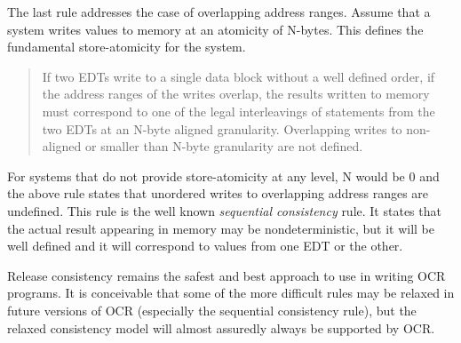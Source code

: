 The last rule addresses the case of overlapping address ranges.  Assume that
a system writes values to memory at an atomicity of N-bytes.  This defines
the fundamental store-atomicity for the system.
\begin{quote}
If two EDTs write to a single data block without a well defined order,
if the address ranges of the writes overlap, the results written to
memory must correspond to one of the legal interleavings of statements
from the two EDTs at an N-byte aligned granularity. Overlapping writes
to non-aligned or smaller than N-byte granularity are not defined.
\end{quote}
For systems that do not provide store-atomicity at any level, N would be 0
and the above rule states that unordered writes to overlapping address
ranges are undefined.
This rule is the well known \emph{sequential consistency} rule. It states that the actual result appearing in
memory may be nondeterministic, but it will be well defined and it
will correspond to values from one EDT or the other.

Release consistency remains the safest and best approach to use in
writing OCR programs. It is conceivable that some of the more
difficult rules may be relaxed in future versions of OCR (especially
the sequential consistency rule), but the relaxed consistency model
will almost assuredly always be supported by OCR.

